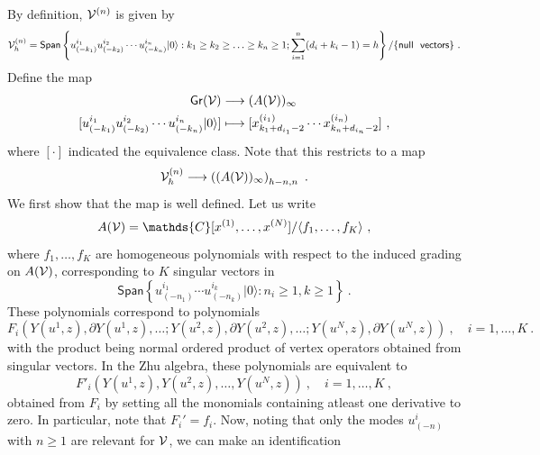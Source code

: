 \documentclass[a4paper,10pt]{article}
\newcommand{\C}{\mathds{C}}
\newcommand{\mr}[1]{\mathsf{#1}}
\def\CV {{\cal V}}
\begin{document}
By definition, $\CV^{(n)}$ is given by 
\begin{equation}
    \CV^{(n)}_h=\mr{Span}\left\{u_{(-k_1)}^{i_1} u_{(-k_2)}^{i_2} \cdots u_{(-k_n)}^{i_n}|0\rangle: k_1 \geq k_2 \geq \ldots \geq k_n\geq 1;\sum_{i=1}^n(d_i+k_i-1)=h \right\}/\{\mr{null~~ vectors}\}~.
\end{equation}
Define the map
\begin{equation}\label{eq:voa_arc_space_zhu}
\begin{split}
    \mr{Gr}(\CV)&\longrightarrow (A(\CV))_\infty
    \\
    [u_{(-k_1)}^{i_1} u_{(-k_2)}^{i_2} \cdots u_{(-k_n)}^{i_n}|0\rangle]&\longmapsto [x^{(i_1)}_{k_1+d_{i_1}-2}\cdots x^{(i_n)}_{k_n+d_{i_n}-2}]~,
\end{split}    
\end{equation}
where $[\cdot]$ indicated the equivalence class.  Note that this restricts to a map 
\begin{equation}\label{eq:iso_ref_char_Hilbert_ser}
\CV^{(n)}_h\longrightarrow  \left((A(\CV))_\infty\right)_{h-n,n}~.    
\end{equation}
We first show that the map is well defined. Let us write
\begin{equation}
    A(\CV)=\C[x^{(1)},\dots,x^{(N)}]/\langle f_1,\dots,f_K\rangle~,
\end{equation}
where $f_1,\dots,f_K$ are homogeneous polynomials with respect to the induced grading on $A(\CV)$, corresponding to $K$ singular vectors in 
\begin{equation}
    \mathsf{Span}\left\{u^{i_1}_{(-n_1)}\cdots u^{i_k}_{(-n_k)}|0\rangle:n_i\geq 1,k\geq 1\right\}~.
\end{equation}
These polynomials correspond to polynomials 
\begin{equation}
    F_i(Y(u^1,z),\partial Y(u^1,z),\dots;Y(u^2,z),\partial Y(u^2,z),\dots; Y(u^N,z),\partial Y(u^N,z))~,\quad i=1,\dots,K~.
\end{equation}
with the product being normal ordered product of vertex operators obtained from singular vectors. In the Zhu algebra, these polynomials are equivalent to  
\begin{equation}\label{eq:Fi'_sing_rel}
    F'_i(Y(u^1,z),Y(u^2,z),\dots,Y(u^N,z))~,\quad i=1,\dots,K~,
\end{equation}
obtained from $F_i$ by setting all the monomials containing atleast one derivative to zero. In particular, note that $F_i'=f_i$. Now, noting that only the  modes $u^i_{(-n)}$ with $n\geq 1$ are relevant for $\CV$, we can make an identification 
\end{document}

